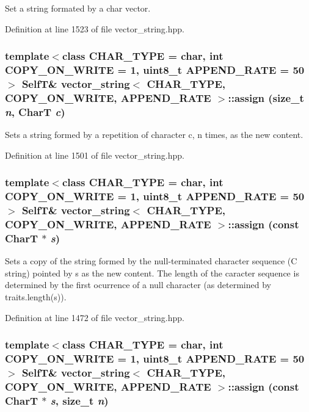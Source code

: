 Set a string formated by a char vector. 

Definition at line 1523 of file vector\_\-string.hpp.\hypertarget{classvector__string_ea3113685a1ba396a16bd076ea95a97a}{
\subsubsection[{assign}]{\setlength{\rightskip}{0pt plus 5cm}template$<$class CHAR\_\-TYPE  = char, int COPY\_\-ON\_\-WRITE = 1, uint8\_\-t APPEND\_\-RATE = 50$>$ {\bf SelfT}\& {\bf vector\_\-string}$<$ CHAR\_\-TYPE, COPY\_\-ON\_\-WRITE, APPEND\_\-RATE $>$::assign (size\_\-t {\em n}, \/  CharT {\em c})}}
\label{classvector__string_ea3113685a1ba396a16bd076ea95a97a}


Sets a string formed by a repetition of character c, n times, as the new content. 

Definition at line 1501 of file vector\_\-string.hpp.\hypertarget{classvector__string_34c0ca4e69795856ed1b31c67c72ffff}{
\subsubsection[{assign}]{\setlength{\rightskip}{0pt plus 5cm}template$<$class CHAR\_\-TYPE  = char, int COPY\_\-ON\_\-WRITE = 1, uint8\_\-t APPEND\_\-RATE = 50$>$ {\bf SelfT}\& {\bf vector\_\-string}$<$ CHAR\_\-TYPE, COPY\_\-ON\_\-WRITE, APPEND\_\-RATE $>$::assign (const CharT $\ast$ {\em s})}}
\label{classvector__string_34c0ca4e69795856ed1b31c67c72ffff}


Sets a copy of the string formed by the null-terminated character sequence (C string) pointed by s as the new content. The length of the caracter sequence is determined by the first ocurrence of a null character (as determined by traits.length(s)). 

Definition at line 1472 of file vector\_\-string.hpp.\hypertarget{classvector__string_6122c21fde4b8731e4eba761b1803900}{
\subsubsection[{assign}]{\setlength{\rightskip}{0pt plus 5cm}template$<$class CHAR\_\-TYPE  = char, int COPY\_\-ON\_\-WRITE = 1, uint8\_\-t APPEND\_\-RATE = 50$>$ {\bf SelfT}\& {\bf vector\_\-string}$<$ CHAR\_\-TYPE, COPY\_\-ON\_\-WRITE, APPEND\_\-RATE $>$::assign (const CharT $\ast$ {\em s}, \/  size\_\-t {\em n})}}
\label{classvector__string_6122c21fde4b8731e4eba761b1803900}


